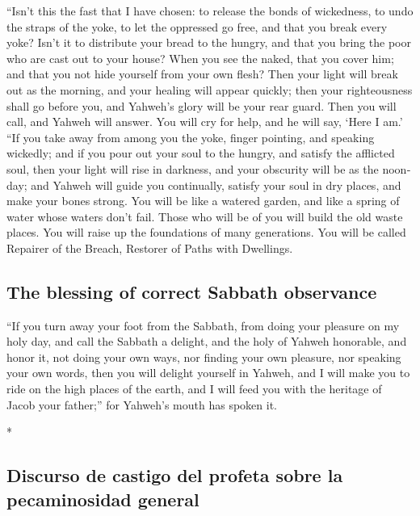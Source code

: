 \begin{paracol}{2}
\begin{otherlanguage}{english}
 ``Isn't this the fast that I have chosen: to release the
bonds of wickedness, to undo the straps of the yoke, to let the
oppressed go free, and that you break every yoke?  Isn't
it to distribute your bread to the hungry, and that you bring the poor
who are cast out to your house? When you see the naked, that you cover
him; and that you not hide yourself from your own flesh? 
Then your light will break out as the morning, and your healing will
appear quickly; then your righteousness shall go before you, and
Yahweh's glory will be your rear guard.  Then you will
call, and Yahweh will answer. You will cry for help, and he will say,
`Here I am.' ``If you take away from among you the yoke, finger
pointing, and speaking wickedly;  and if you pour out
your soul to the hungry, and satisfy the afflicted soul, then your light
will rise in darkness, and your obscurity will be as the noonday;
 and Yahweh will guide you continually, satisfy your soul
in dry places, and make your bones strong. You will be like a watered
garden, and like a spring of water whose waters don't fail.
 Those who will be of you will build the old waste
places. You will raise up the foundations of many generations. You will
be called Repairer of the Breach, Restorer of Paths with Dwellings.

\hypertarget{the-blessing-of-correct-sabbath-observance}{%
\subsection{The blessing of correct Sabbath
observance}\label{the-blessing-of-correct-sabbath-observance}}

 ``If you turn away your foot from the Sabbath, from
doing your pleasure on my holy day, and call the Sabbath a delight, and
the holy of Yahweh honorable, and honor it, not doing your own ways, nor
finding your own pleasure, nor speaking your own words, 
then you will delight yourself in Yahweh, and I will make you to ride on
the high places of the earth, and I will feed you with the heritage of
Jacob your father;'' for Yahweh's mouth has spoken it.

\end{otherlanguage}

\switchcolumn[0]*

\hypertarget{discurso-de-castigo-del-profeta-sobre-la-pecaminosidad-general}{%
\subsection{Discurso de castigo del profeta sobre la pecaminosidad
general}\label{discurso-de-castigo-del-profeta-sobre-la-pecaminosidad-general}}


\end{paracol}
